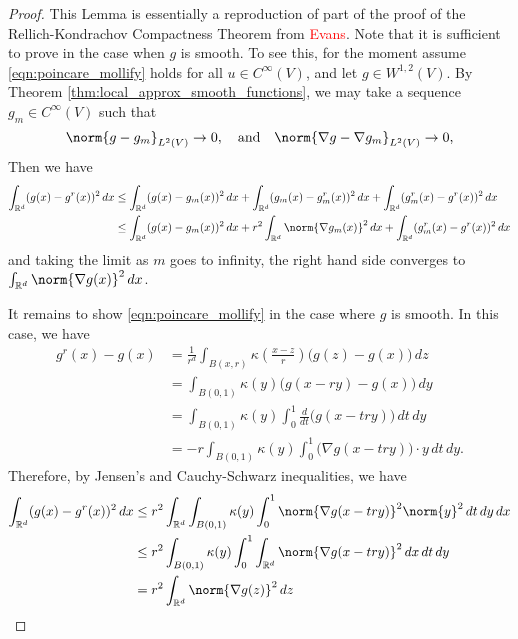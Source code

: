 \documentclass{article}
\newcommand{\Reals}{\mathbb{R}}
\newcommand{\1}{\mathbf{1}}
\newcommand{\Rd}{\Reals^d}
\theoremstyle{alden}
\theoremstyle{aldenthm}
\theoremstyle{definition}
\theoremstyle{remark}
\begin{document}
\begin{proof}
	This Lemma is essentially a reproduction of part of the proof of the Rellich-Kondrachov Compactness Theorem from \textcolor{red}{Evans}. Note that it is sufficient to prove in the case when $g$ is smooth. To see this, for the moment assume \eqref{eqn:poincare_mollify} holds for all $u \in C^{\infty}(V)$, and let $g \in W^{1,2}(V)$. By Theorem \ref{thm:local_approx_smooth_functions}, we may take a sequence $g_m \in C^{\infty}(V)$ such that
	\begin{equation*}
	\norm{g - g_m}_{L^2(V)} \to 0, \quad \textrm{and} \quad \norm{\nabla g - \nabla g_m}_{L^2(V)} \to 0,
	\end{equation*}
	Then we have
	\begin{align*}
	\int_{\Rd} (g(x) - g^r(x))^2 \,dx & \leq \int_{\Rd} (g(x) - g_m(x))^2 \,dx + \int_{\Rd}(g_m(x) - g_m^r(x))^2 \,dx + \int_{\Rd}(g_m^r(x) - g^r(x))^2 \,dx \\
	& \leq \int_{\Rd} (g(x) - g_m(x))^2 \,dx + r^2 \int_{\Rd} \norm{\nabla g_m(x)}^2 \,dx + \int_{\Rd}(g_m^r(x) - g^r(x))^2 \,dx
	\end{align*}
	and taking the limit as $m$ goes to infinity, the right hand side converges to $\int_{\Rd} \norm{\nabla g(x)}^2 \,dx$. 
	
	It remains to show \eqref{eqn:poincare_mollify} in the case where $g$ is smooth. In this case, we have
	\begin{align*}
	g^{r}(x) -  g(x) & = \frac{1}{r^d} \int_{B(x,r)} \kappa \left(\frac{x - z}{r}\right)\bigl(g(z) - g(x)\bigr) \,dz \\
	& = \int_{B(0,1)} \kappa(y) \bigl(g(x - ry) - g(x)\bigr) \,dy \\
	& = \int_{B(0,1)} \kappa(y) \int_{0}^{1} \frac{d}{dt} \bigl(g(x - try) \bigr) \,dt \,dy \\
	& = -r \int_{B(0,1)} \kappa(y) \int_{0}^{1} \bigl(\nabla g (x - try) \bigr) \cdot y \,dt \,dy.
	\end{align*} 
	Therefore, by Jensen's and Cauchy-Schwarz inequalities, we have
	\begin{align*}
	\int_{\Rd} (g(x) - g^r(x))^2 \,dx & \leq r^2 \int_{\Rd} \int_{B(0,1)} \kappa(y) \int_{0}^{1} \norm{\nabla g (x - try)}^2 \norm{y}^2 \,dt \,dy \,dx \\
	& \leq r^2 \int_{B(0,1)} \kappa(y) \int_{0}^{1} \int_{\Rd} \norm{\nabla g (x - try)}^2 \,dx \,dt \,dy \\
	& = r^2 \int_{\Rd} \norm{\nabla g(z)}^2 \,dz
	\end{align*}
\end{proof}
\end{document}
